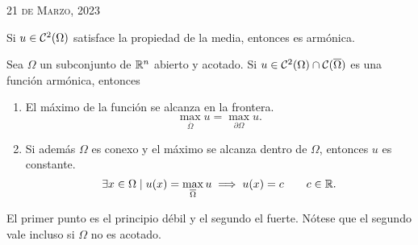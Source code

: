 \documentclass[../edp.tex]{subfiles}
\begin{document}
{\scshape \hfill 21 de Marzo, 2023}

\begin{Teorema}
	Si \(u\in\mathcal{C}^{2}(\Omega)\) satisface la propiedad de la media, entonces es
	armónica.
\end{Teorema}
\begin{Demostracion}
	
\end{Demostracion}

\begin{Teorema}
	Sea \(\Omega\) un subconjunto de \(\mathbb{R}^n\) abierto y acotado. Si \(u\in
	\mathcal{C}^{2}(\Omega) \cap \mathcal{C}(\overline{\Omega})\) es una función armónica,
	entonces
	\begin{enumerate}[topsep=0pt,itemsep=0pt]
		\item El máximo de la función se alcanza en la frontera.
			\begin{displaymath}
				\max_{\overline\Omega} u 
				= 
				\max_{\partial\Omega} u.
			\end{displaymath}
		\item Si además \(\Omega\) es conexo y el máximo se alcanza dentro de
			\(\Omega\), entonces \(u\) es constante.
			\begin{displaymath}
				\exists x \in \Omega 
				\mid
				u(x) = \max_{\overline\Omega} u
				\implies
				u(x) = c
				\qquad c\in \mathbb{R}.
			\end{displaymath}
	\end{enumerate}
	El primer punto es el principio débil y el segundo el fuerte. Nótese que el
	segundo vale incluso si \(\Omega\) no es acotado.
\end{Teorema}
\end{document}
